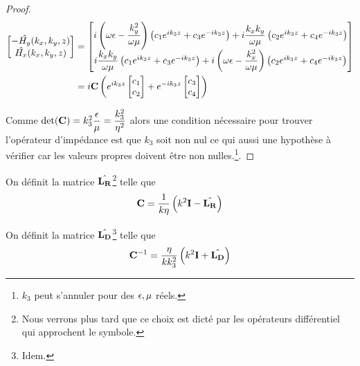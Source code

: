 \begin{proof}
        \begin{align}
            \begin{bmatrix}
                -\hat{H_y}(k_x,k_y,z)\\
                \hat{H_x}(k_x,k_y,z)\\
            \end{bmatrix}
            &=
            \begin{bmatrix}
                i\left(\omega\epsilon - \dfrac{k_y^2}{\omega\mu}\right) \left( c_1 e^{ik_3 z} + c_3 e^{-ik_3 z} \right) + i\dfrac{k_xk_y}{\omega\mu} \left( c_2 e^{ik_3 z} + c_4 e^{-ik_3 z} \right)
                \\
                i\dfrac{k_xk_y}{\omega\mu} \left( c_1 e^{ik_3 z} + c_3 e^{-ik_3 z} \right) + i\left(\omega\epsilon - \dfrac{k_x^2}{\omega\mu}\right)\left( c_2 e^{ik_3 z} + c_4 e^{-ik_3 z} \right)
            \end{bmatrix} \\
            &=i
            \mathbf{C}
            \left(
                e^{ik_3 z}
                \begin{bmatrix}
                    c_1 \\
                    c_2
                \end{bmatrix}
                +e^{-ik_3 z}
                \begin{bmatrix}
                    c_3 \\
                    c_4
                \end{bmatrix}
            \right)
        \end{align}

        Comme \(\det(\mathbf{C}) = k_3^2\dfrac{\epsilon}{\mu}=\dfrac{k_3^2}{\eta^2}\) alors une condition nécessaire pour trouver l'opérateur d'impédance est que \(k_3\) soit non nul ce qui aussi une hypothèse à vérifier car les valeurs propres doivent être non nulles.\footnote{\(k_3\) peut s'annuler pour des \(\epsilon,\mu\) réels.}.

    \end{proof}

    On définit la matrice \(\hat{\mathbf{L_R}}\)\footnote{Nous verrons plus tard que ce choix est dicté par les opérateurs différentiel qui approchent le symbole.} telle que
    \begin{equation}
        \mathbf{C} = \dfrac{1}{k\eta}\left(k^2\mathbf{I}  - \hat{\mathbf{L_R}}\right)
    \end{equation}

    On définit la matrice \(\hat{\mathbf{L_D}}\)\footnote{Idem.} telle que
    \begin{equation}
        \mathbf{C}^{-1} = \dfrac{\eta}{kk_3^2}\left(k^2\mathbf{I} + \hat{\mathbf{L_D}}\right)
    \end{equation}

